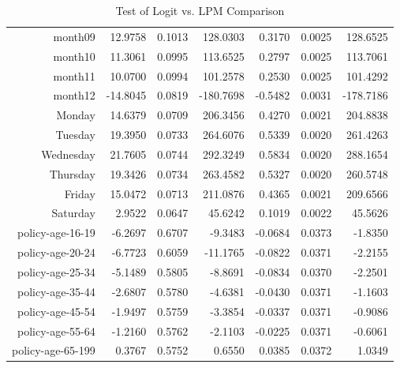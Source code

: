 \documentclass[11pt]{article}
\begin{document}
\begin{table}[ht]
\begin{tabular}{rrrrrrr}
  month09 & 12.9758 & 0.1013 & 128.0303 & 0.3170 & 0.0025 & 128.6525 \\ 
  month10 & 11.3061 & 0.0995 & 113.6525 & 0.2797 & 0.0025 & 113.7061 \\ 
  month11 & 10.0700 & 0.0994 & 101.2578 & 0.2530 & 0.0025 & 101.4292 \\ 
  month12 & -14.8045 & 0.0819 & -180.7698 & -0.5482 & 0.0031 & -178.7186 \\ 
  Monday & 14.6379 & 0.0709 & 206.3456 & 0.4270 & 0.0021 & 204.8838 \\ 
  Tuesday & 19.3950 & 0.0733 & 264.6076 & 0.5339 & 0.0020 & 261.4263 \\ 
  Wednesday & 21.7605 & 0.0744 & 292.3249 & 0.5834 & 0.0020 & 288.1654 \\ 
  Thursday & 19.3426 & 0.0734 & 263.4582 & 0.5327 & 0.0020 & 260.5748 \\ 
  Friday & 15.0472 & 0.0713 & 211.0876 & 0.4365 & 0.0021 & 209.6566 \\ 
  Saturday & 2.9522 & 0.0647 & 45.6242 & 0.1019 & 0.0022 & 45.5626 \\ 
  policy-age-16-19 & -6.2697 & 0.6707 & -9.3483 & -0.0684 & 0.0373 & -1.8350 \\ 
  policy-age-20-24 & -6.7723 & 0.6059 & -11.1765 & -0.0822 & 0.0371 & -2.2155 \\ 
  policy-age-25-34 & -5.1489 & 0.5805 & -8.8691 & -0.0834 & 0.0370 & -2.2501 \\ 
  policy-age-35-44 & -2.6807 & 0.5780 & -4.6381 & -0.0430 & 0.0371 & -1.1603 \\ 
  policy-age-45-54 & -1.9497 & 0.5759 & -3.3854 & -0.0337 & 0.0371 & -0.9086 \\ 
  policy-age-55-64 & -1.2160 & 0.5762 & -2.1103 & -0.0225 & 0.0371 & -0.6061 \\ 
  policy-age-65-199 & 0.3767 & 0.5752 & 0.6550 & 0.0385 & 0.0372 & 1.0349 \\ 
   \hline
\end{tabular}
\caption{Test of Logit vs. LPM Comparison} 
\label{tab:test}
\end{table}
\end{document}
